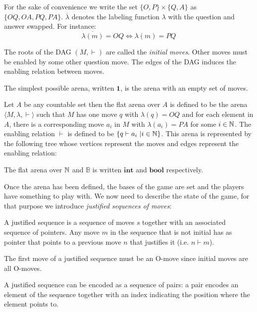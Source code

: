 For the sake of convenience we write the set $\{O,P\} \times \{Q,A\}$ as $\{OQ,OA,PQ,PA\}$.
$\overline{\lambda}$ denotes the labeling function $\lambda$ with the question and answer swapped. For instance:
$$\overline{\lambda(m)} = OQ \iff \lambda(m) = PQ$$

The roots of the DAG $(M,\vdash)$ are called the \emph{initial moves}.
Other moves must be enabled by some other question move. The edges of the DAG induces the enabling relation between moves.

The simplest possible arena, written $\mathbf{1}$, is the arena with an empty set of moves.

\begin{exmp}
\label{exmp:flatarena}

 Let $A$ be any countable set then the flat arena over $A$
is defined to be the arena $\langle M, \lambda, \vdash \rangle$ such
that $M$ has one move $q$ with $\lambda(q) = OQ$ and for each
element in $A$, there is a corresponding move $a_i$ in $M$ with
$\lambda(a_i) = PA$ for some $i \in \mathbb{N}$. The enabling relation
$\vdash$ is defined to be $\{ q \vdash a_i \ | i \in \mathbb{N} \}$.
This arena is represented by the following tree whose vertices represent the moves and edges represent the enabling relation:
\begin{center}
    {      \TR{\ldots} }
\end{center}
The flat arena over $\mathbb{N}$ and $\mathbb{B}$ is written
$\mathbf{int}$ and  $\mathbf{bool}$ respectively.
\end{exmp}

Once the arena has been defined, the bases of the game are set and the players have something to play with.
We now need to describe the state of the game, for that purpose
we introduce \emph{justified sequences of moves}:
\begin{dfn}
A justified sequence is a sequence of moves $s$ together with an associated sequence of pointers. Any
move $m$ in the sequence that is not initial has as pointer that points to a previous move $n$ that justifies it (i.e. $n \vdash m$).
\end{dfn}
The first move of a justified sequence must be an O-move since
initial moves are all O-moves.

A justified sequence can be encoded as a sequence of pairs: a pair encodes an element of the sequence together
with an index indicating the position where the element points to.

